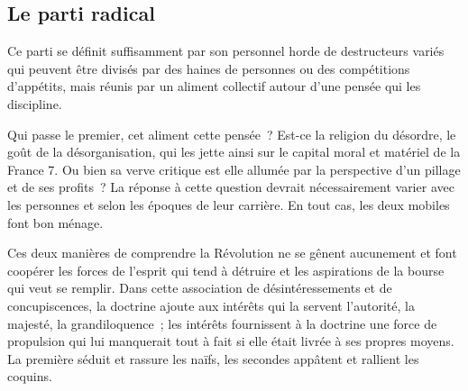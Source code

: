 \documentclass[french,twoside]{book} %
\newcommand{\astermono}{\medskip\centerline{\color{rubric}\large\selectfont{\syms ✻}}\medskip\par}%
\begin{document}
\astermono

\subsection[{Le parti radical}]{Le parti radical}
\noindent Ce parti se définit suffisamment par son personnel horde de destructeurs variés qui peuvent être divisés par des haines de personnes ou des compétitions d’appétits, mais réunis par un aliment collectif autour d’une pensée qui les discipline.\par
Qui passe le premier, cet aliment cette pensée ? Est-ce la religion du désordre, le goût de la désorganisation, qui les jette ainsi sur le capital moral et matériel de la France 7. Ou bien sa verve critique est elle allumée par la perspective d’un pillage et de ses profits ? La réponse à cette question devrait nécessairement varier avec les personnes et selon les époques de leur carrière. En tout cas, les deux mobiles font bon ménage.\par
Ces deux manières de comprendre la Révolution ne se gênent aucunement et font coopérer les forces de l’esprit qui tend à détruire et les aspirations de la bourse qui veut se remplir. Dans cette association de désintéressements et de concupiscences, la doctrine ajoute aux intérêts qui la servent l’autorité, la majesté, la grandiloquence ; les intérêts fournissent à la doctrine une force de propulsion qui lui manquerait tout à fait si elle était livrée à ses propres moyens. La première séduit et rassure les naïfs, les secondes appâtent et rallient les coquins.\par

\astermono
\end{document}

